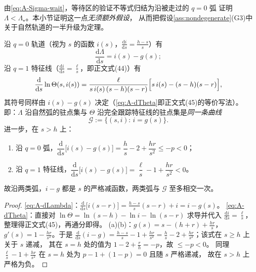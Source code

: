 由\eqref{eq:A-Sigma-wait}，等待区的验证不等式归结为沿被走过的 $q=0$ 弧
证明 $\Lambda<\Lambda_\star$。本小节证明这一点\emph{无须额外假设}，
从而把假设\ref{ass:nondegenerate}(G3)中关于自然轨道的一半升级为定理。

\begin{lemma}[峰值曲线的统一性]
\label{lem:peak-locus}
沿 $q=0$ 轨道（视为 $s$ 的函数 $i(s)$，$\frac{\mathrm{d}i}{\mathrm{d}s}=\frac{h-s}{s}$）有
\begin{equation}
  \frac{\mathrm{d}\Lambda}{\mathrm{d}s}=i(s)-g(s);
  \label{eq:A-dLambda}
\end{equation}
沿 $q=1$ 特征线（$\frac{\mathrm{d}i}{\mathrm{d}s}=\frac{\ell}{s}$，即正文式(44)）有
\begin{equation}
  \frac{\mathrm{d}}{\mathrm{d}s}\ln\Theta(s,i(s))
  =\frac{\ell}{s\,i(s)\,(s-h)(s-r)}\Bigl[s\,i(s)-(s-h)(s-r)\Bigr],
  \label{eq:A-dTheta}
\end{equation}
其符号同样由 $i(s)-g(s)$ 决定（\eqref{eq:A-dTheta}即正文式(45)的等价写法）。
即：$\Lambda$ 沿自然弧的驻点集与 $\Theta$ 沿完全跟踪特征线的驻点集是\emph{同一条曲线}
\begin{equation}
  \mathcal{G}:=\{(s,i):\,i=g(s)\}.
  \label{eq:A-peak-locus}
\end{equation}
进一步，在 $s>h$ 上：
\begin{enumerate}
\item[(a)] 沿 $q=0$ 弧，$\dfrac{\mathrm{d}}{\mathrm{d}s}\bigl[i(s)-g(s)\bigr]
      =\dfrac{h}{s}-2+\dfrac{hr}{s^2}\le -p<0$；
\item[(b)] 沿 $q=1$ 特征线，$\dfrac{\mathrm{d}}{\mathrm{d}s}\bigl[i(s)-g(s)\bigr]
      =\dfrac{\ell}{s}-1+\dfrac{hr}{s^2}<0$。
\end{enumerate}
故沿两类弧，$i-g$ 都是 $s$ 的严格减函数，两类弧与 $\mathcal{G}$ 至多相交一次。
\end{lemma}

\begin{proof}
\eqref{eq:A-dLambda}：$\frac{\mathrm{d}}{\mathrm{d}s}\bigl[i(s-r)\bigr]
=\frac{h-s}{s}(s-r)+i=i-g(s)$。
\eqref{eq:A-dTheta}：直接对 $\ln\Theta=\ln(s-h)-\ln i-\ln(s-r)$ 求导并代入
$\frac{\mathrm{d}i}{\mathrm{d}s}=\frac{\ell}{s}$，整理得正文式(45)，再通分即得。
(a)(b)：$g(s)=s-(h+r)+\frac{hr}{s}$，$g'(s)=1-\frac{hr}{s^2}$。于是
$\frac{\mathrm{d}}{\mathrm{d}s}(i-g)=\frac{h-s}{s}-1+\frac{hr}{s^2}
=\frac{h}{s}-2+\frac{hr}{s^2}$；该式在 $s\ge h$ 上关于 $s$ 递减，
其在 $s=h$ 处的值为 $1-2+\frac{r}{h}=-p$，故 $\le -p<0$。
同理 $\frac{\ell}{s}-1+\frac{hr}{s^2}$ 在 $s=h$ 处为 $p-1+(1-p)=0$ 且随 $s$ 严格递减，
故在 $s>h$ 上严格为负。
\end{proof}

